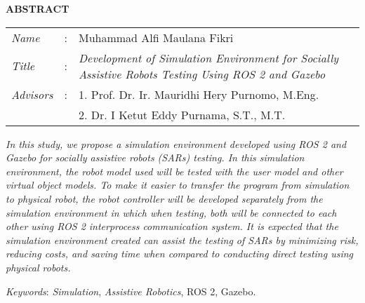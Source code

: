 \begin{center}
  \large\textbf{ABSTRACT}
\end{center}

\vspace{2ex}

\begingroup
  \setlength{\tabcolsep}{0pt}
  \noindent
  \begin{tabularx}{\textwidth}{l >{\centering}m{2em} X}
    \emph{Name}     &:& Muhammad Alfi Maulana Fikri \\
    \emph{Title}    &:&	\emph{Development of Simulation Environment for Socially Assistive Robots Testing Using ROS 2 and Gazebo} \\
    \emph{Advisors} &:& 1. Prof. Dr. Ir. Mauridhi Hery Purnomo, M.Eng. \\
                    & & 2. Dr. I Ketut Eddy Purnama, S.T., M.T. \\
  \end{tabularx}
\endgroup

\emph{
  In this study, we propose a simulation environment developed using ROS 2 and Gazebo for socially assistive robots (SARs) testing.
  In this simulation environment, the robot model used will be tested with the user model and other virtual object models.
  To make it easier to transfer the program from simulation to physical robot, the robot controller will be developed separately from the simulation environment in which when testing, both will be connected to each other using ROS 2 interprocess communication system.
  It is expected that the simulation environment created can assist the testing of SARs by minimizing risk, reducing costs, and saving time when compared to conducting direct testing using physical robots.
}

\emph{Keywords}: \emph{Simulation}, \emph{Assistive Robotics}, ROS 2, Gazebo.
